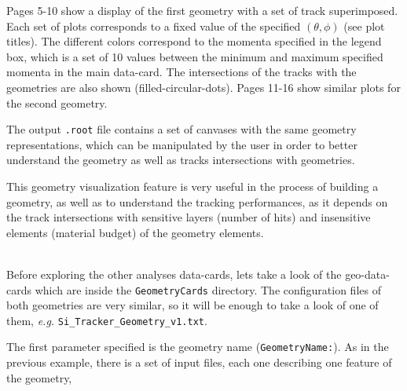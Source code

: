 Pages 5-10 show a display of the first geometry with a set of track superimposed. Each set of plots corresponds to a fixed value of the specified
$(\theta,\phi)$ (see plot titles). The different colors correspond to the momenta specified in the legend box, which is a set of 10 values 
between the minimum and maximum specified momenta in the main data-card. The intersections of the tracks with the geometries are also shown 
(filled-circular-dots). Pages 11-16 show similar plots for the second geometry.

The output {\tt .root} file contains a set of canvases with the same geometry representations, which can be manipulated by the user in order to 
better understand the geometry as well as tracks intersections with geometries.

This geometry visualization feature is very useful in the process of building a geometry, as well as to understand the tracking performances, as 
it depends on the track intersections with sensitive layers (number of hits) and insensitive elements (material budget) of the geometry elements. 

~\\
Before exploring the other analyses data-cards, lets take a look of the geo-data-cards which are inside the {\tt GeometryCards} directory. The 
configuration files of both geometries are very similar, so it will be enough to take a look of one of them, {\it e.g.} {\tt Si\_Tracker\_Geometry\_v1.txt}.

The first parameter specified is the geometry name ({\tt GeometryName:}). As in the previous example, there is a set of input files, each one describing 
one feature of the geometry,

